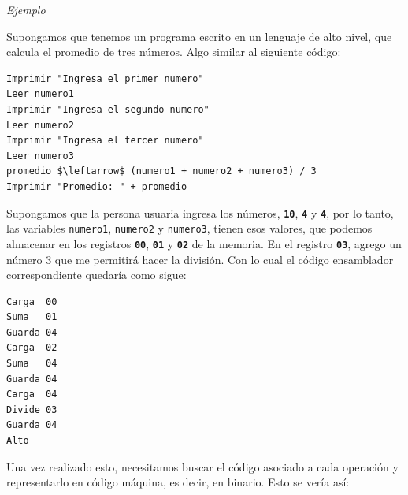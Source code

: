\documentclass[11pt,spanish]{article}
\begin{document}
\begin{bclogo}[noborder=true, couleurBarre=celestialblue,arrondi =0.1, couleur =anti-flashwhite, logo=\bccrayon, marge =10]{\textit{Ejemplo}}
\vspace{0.25cm}

Supongamos que tenemos un programa escrito en un lenguaje de alto
nivel, que calcula el promedio de tres números. Algo similar al siguiente
código:

\bigskip{}

\begin{lstlisting}[basicstyle={\ttfamily},tabsize=4,mathescape=true]
Imprimir "Ingresa el primer numero"
Leer numero1
Imprimir "Ingresa el segundo numero"
Leer numero2
Imprimir "Ingresa el tercer numero"
Leer numero3
promedio $\leftarrow$ (numero1 + numero2 + numero3) / 3
Imprimir "Promedio: " + promedio
\end{lstlisting}
Supongamos que la persona usuaria ingresa los números, \texttt{\textbf{10}},
\texttt{\textbf{4}} y \texttt{\textbf{4}}, por lo tanto, las variables
\texttt{numero1}, \texttt{numero2} y \texttt{numero3}, tienen esos
valores, que podemos almacenar en los registros \texttt{\textbf{00}},
\texttt{\textbf{01}} y \texttt{\textbf{02}} de la memoria. En el registro
\texttt{\textbf{03}}, agrego un número 3 que me permitirá hacer la
división. Con lo cual el código ensamblador correspondiente quedaría
como sigue:

\bigskip{}

\begin{lstlisting}[basicstyle={\ttfamily},tabsize=4,mathescape=true]
Carga  00
Suma   01
Guarda 04
Carga  02
Suma   04
Guarda 04
Carga  04
Divide 03
Guarda 04
Alto
\end{lstlisting}
Una vez realizado esto, necesitamos buscar el código asociado a cada
operación y representarlo en código máquina, es decir, en binario. Esto
se vería así:

\bigskip{}


\end{bclogo}
\end{document}
